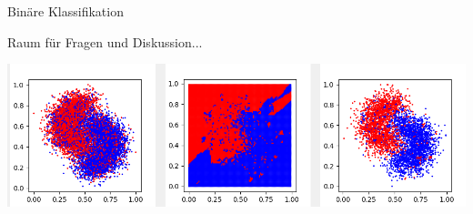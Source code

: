 \documentclass[9pt]{beamer}
\begin{document}
\begin{frame}{Binäre Klassifikation}
\begin{huge}
Raum für Fragen und Diskussion...
\end{huge}
\begin{center}
\includegraphics[scale=0.5]{assets/bananas-2-2d-lowk.png}
\end{center}
\end{frame}
\end{document}

